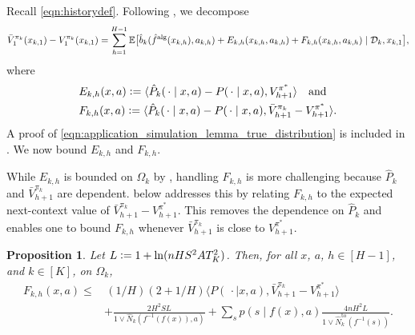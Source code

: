 \documentclass[11pt]{article}
\newcommand{\eqdef}{\vcentcolon=}
\newcommand{\mcD}{\mathcal{D}}
\newcommand{\mbbE}{\mathbb{E}}
\newcommand{\alg}{\textnormal{alg}}
\newtheorem{proposition}[theorem]{Proposition}
\theoremstyle{definition}
\theoremstyle{definition}
\begin{document}
Recall \eqref{eqn:historydef}.
Following \cite{UCRLVI}, we decompose
\begin{equation}
	\bar{V}^{\pi_k}_1(x_{k,1})
	-
	V^{\pi_k}_1(x_{k,1})
	=
	\sum_{h=1}^{H-1}\mbbE\bigl[
		\hat{b}_{k}(\hat{f}^{\alg}(x_{k,h}),a_{k,h})
		+
		E_{k,h}(x_{k,h},a_{k,h})
		+
		F_{k,h}(x_{k,h},a_{k,h})
		\mid \mcD_k, x_{k,1}
	\bigr]
	,
	\label{eqn:application_simulation_lemma_true_distribution}
\end{equation}
where
\begin{equation}
	\begin{split}
		&
		E_{k,h}(x,a)
		\eqdef
		\langle \hat{P}_k(\,\cdot\mid x,a)-P(\,\cdot\mid x,a), V^{\pi^*}_{h+1}\rangle
		\quad
		\mathrm{and}
		\\
		&
		F_{k,h}(x,a)
		\eqdef
		\langle \hat{P}_k(\,\cdot\mid x,a)-P(\,\cdot\mid x,a), \bar{V}^{\pi_k}_{h+1}-V^{\pi^*}_{h+1}\rangle
		.
	\end{split}
\end{equation}
A proof of \eqref{eqn:application_simulation_lemma_true_distribution} is included in .
We now bound $E_{k,h}$ and $F_{k,h}$.

While $E_{k,h}$ is bounded on $\Omega_k$ by , handling $F_{k,h}$ is more challenging because $\hat{P}_k$ and $\bar{V}^{\pi_k}_{h+1}$ are dependent.
 below addresses this by relating $F_{k,h}$ to the expected next-context value of $\bar{V}^{\pi_k}_{h+1}-V^{\pi^*}_{h+1}$.
This removes the dependence on $\hat{P}_k$ and enables one to bound $F_{k,h}$ whenever $\bar{V}^{\pi_k}_{h+1}$ is close to $V^{\pi^*}_{h+1}$.

\begin{proposition}
	\label{prop:concentration_bound_nonnegative_vector}
	Let $L\eqdef 1+\ln(nHS^2AT_K^2)$.
	Then, for all $x$, $a$, $h\in[H-1]$, and $k\in[K]$, on $\Omega_k$,
	\begin{equation}
		\label{eqn:concentration_bound_nonnegative_vector_large_P}
		\begin{split}
			F_{k,h}(x,a)
			\leq
			&\,
			(1/H)(2+1/H)
			\langle P(\,\cdot\mid  x,a), \bar{V}^{\pi_k}_{h+1} - V^{\pi^*}_{h+1}\rangle
			\\
			&
			+
			\frac{2H^2SL}{1\vee \hat{N}_k(f^{-1}(f(x)),a)}
			+
			\sum_{s}p(s\mid f(x),a)\frac{4n H^2L}{1\vee \hat{N}^{\mathrm{to}}_k(f^{-1}(s))}
			.
		\end{split}
	\end{equation}
\end{proposition}
\end{document}
